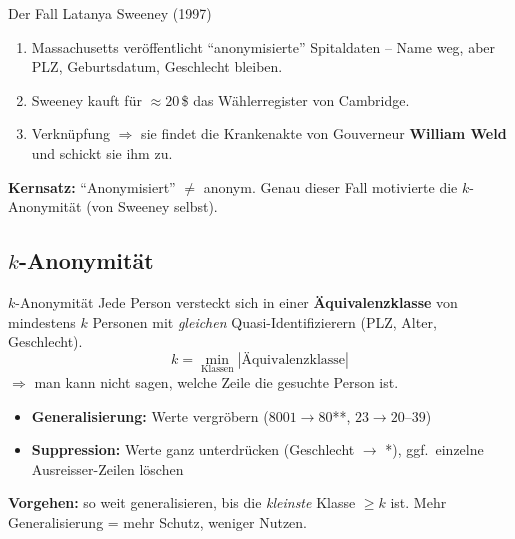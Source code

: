 \documentclass[a4paper, fontsize=7pt]{scrartcl}
\begin{document}
\begin{subbox}{Der Fall Latanya Sweeney (1997)}
\begin{enumerate}
    \item Massachusetts veröffentlicht ``anonymisierte'' Spitaldaten --
          Name weg, aber PLZ, Geburtsdatum, Geschlecht bleiben.
    \item Sweeney kauft für $\approx 20$\,\$ das Wählerregister von
          Cambridge.
    \item Verknüpfung $\Rightarrow$ sie findet die Krankenakte von
          Gouverneur \textbf{William Weld} und schickt sie ihm zu.
\end{enumerate}
\textbf{Kernsatz:} ``Anonymisiert'' $\neq$ anonym. Genau dieser Fall
motivierte die $k$-Anonymität (von Sweeney selbst).
\end{subbox}

\subsection{$k$-Anonymität}

\begin{mainbox}{$k$-Anonymität}
Jede Person versteckt sich in einer \textbf{Äquivalenzklasse} von mindestens
$k$ Personen mit \emph{gleichen} Quasi-Identifizierern (PLZ, Alter,
Geschlecht).
$$\boxed{k = \min_{\text{Klassen}} |\text{Äquivalenzklasse}|}$$
$\Rightarrow$ man kann nicht sagen, welche Zeile die gesuchte Person ist.
\begin{itemize}
    \item \textbf{Generalisierung:} Werte vergröbern
          ($8001 \to 80$**, $23 \to 20$--$39$)
    \item \textbf{Suppression:} Werte ganz unterdrücken
          (Geschlecht $\to$ *), ggf.\ einzelne Ausreisser-Zeilen löschen
\end{itemize}
\textbf{Vorgehen:} so weit generalisieren, bis die \emph{kleinste} Klasse
$\ge k$ ist. Mehr Generalisierung = mehr Schutz, weniger Nutzen.
\end{mainbox}
\end{document}
